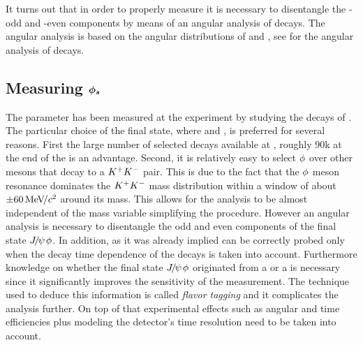 It turns out that in order to properly measure \phis it is necessary to disentangle the \CP-odd and \CP-even
components by means of an angular analysis of \BsJpsiPhi decays. The angular analysis is based on the
angular distributions of \phiKK and \Jpsimumu, see  for the angular analysis
of \BsJpsiKst decays.

\subsection{Measuring $\boldsymbol{\phi_{s}}$}
\label{measuring_phis}

The parameter \phis has been measured at the \lhcb experiment by studying the decays of \BsJpsiPhi \cite{phis-3fb-paper}.
The particular choice of the final state, where \phiKK and \Jpsimumu, is preferred for several reasons. First the large number
of selected \BsJpsiPhi decays available at \lhcb, roughly $90$k at the end of the \runtwo is an advantage. Second, it is relatively
easy to select $\phi$ over other mesons that decay to a $K^+K^-$ pair. This is due to the fact that the $\phi$ meson resonance dominates
the $K^+K^-$ mass distribution within a window of about $\pm 60 {\mathrm{\,Me\kern -0.1em V\!/}c^2}$ around its mass. This allows for the analysis to be
almost independent of the \mKK mass variable simplifying the procedure. However an angular analysis is necessary
to disentangle the odd and even \CP components of the final state ${J\mskip -3mu/\mskip -2mu\psi\mskip 2mu}\phi$.
In addition, as it was already implied \phis can be correctly probed only when the decay time dependence of the \BsJpsiPhi decays is taken into
account. Furthermore knowledge on whether the final state ${J\mskip -3mu/\mskip -2mu\psi\mskip 2mu}\phi$ originated from a \Bs or a \Bsb is necessary since it
significantly improves the sensitivity of the \phis measurement. The technique used to deduce this information is called {\it flavor tagging}
and it complicates the analysis further. On top of that experimental effects such as angular and time efficiencies plus modeling the
\lhcb detector's time resolution need to be taken into account.

